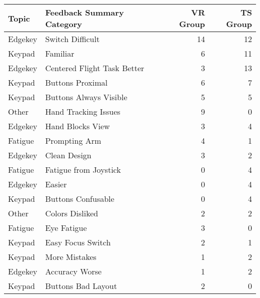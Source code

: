 \begin{tabular}{@{}llrr@{}}
\toprule
   Topic &    Feedback Summary Category &  VR Group &  TS Group \\
\midrule
 Edgekey &             Switch Difficult &        14 &        12 \\
  Keypad &                     Familiar &         6 &        11 \\
 Edgekey &  Centered Flight Task Better &         3 &        13 \\
  Keypad &             Buttons Proximal &         6 &         7 \\
  Keypad &       Buttons Always Visible &         5 &         5 \\
   Other &         Hand Tracking Issues &         9 &         0 \\
 Edgekey &             Hand Blocks View &         3 &         4 \\
 Fatigue &                Prompting Arm &         4 &         1 \\
 Edgekey &                 Clean Design &         3 &         2 \\
 Fatigue &        Fatigue from Joystick &         0 &         4 \\
 Edgekey &                       Easier &         0 &         4 \\
  Keypad &           Buttons Confusable &         0 &         4 \\
   Other &              Colors Disliked &         2 &         2 \\
 Fatigue &                  Eye Fatigue &         3 &         0 \\
  Keypad &            Easy Focus Switch &         2 &         1 \\
  Keypad &                More Mistakes &         1 &         2 \\
 Edgekey &               Accuracy Worse &         1 &         2 \\
  Keypad &           Buttons Bad Layout &         2 &         0 \\
\bottomrule
\end{tabular}
